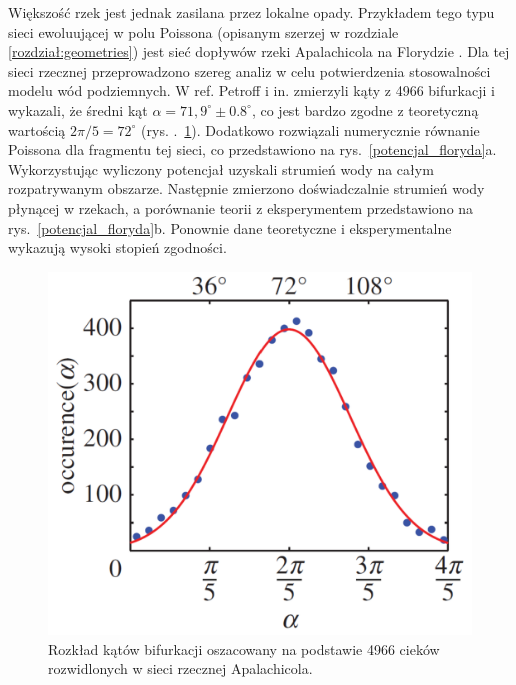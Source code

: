 \documentclass[]{pracamgr}
\begin{document}
      Większość rzek jest jednak zasilana przez lokalne opady. Przykładem tego typu sieci ewoluującej w polu Poissona (opisanym szerzej w rozdziale \ref{rozdział:geometries}) jest sieć dopływów rzeki Apalachicola na Florydzie \cite{schumm1995ground}. Dla tej sieci rzecznej przeprowadzono szereg analiz w celu potwierdzenia stosowalności modelu wód podziemnych. W ref. \cite{petroff2013bifurcation} Petroff i in. zmierzyli kąty z 4966 bifurkacji i wykazali, że średni kąt $\alpha = 71,9^\circ \pm 0.8^\circ$, co jest bardzo zgodne z teoretyczną wartością $2\pi/5=72^\circ$ (rys. .~\ref{apalachicola_katy}). Dodatkowo rozwiązali numerycznie równanie Poissona dla fragmentu tej sieci, co przedstawiono na rys.~\ref{potencjal_floryda}a. Wykorzystując wyliczony potencjał uzyskali strumień wody na całym rozpatrywanym obszarze. Następnie zmierzono doświadczalnie strumień wody płynącej w rzekach, a porównanie teorii z eksperymentem przedstawiono na rys.~\ref{potencjal_floryda}b. Ponownie dane teoretyczne i eksperymentalne wykazują wysoki stopień zgodności.

      \begin{figure}[H]
        \centering
        \begin{minipage}{0.4\textwidth}
          \caption{Rozkład kątów bifurkacji oszacowany na podstawie 4966 cieków rozwidlonych w sieci rzecznej Apalachicola.}
          \label{apalachicola_katy}
        \end{minipage}
        \hspace{20pt}
        \begin{minipage}{0.5\textwidth}
          \centering
          \includegraphics[width=1\textwidth]{figs/florida_angles.png}
          \end{minipage}
    \end{figure}  
\end{document}
